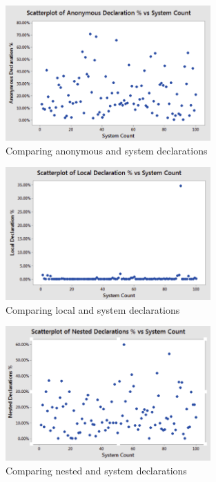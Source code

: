 \documentclass[12p]{article}
\begin{document}
\begin{figure}[h]
  \begin{center}
    \includegraphics[width=0.7\textwidth]{AnonVsSystemDeclarations.PNG}
    \caption{Comparing anonymous and system declarations}
    \label{fig:AnonVsSystemDeclarations}
  \end{center}
\end{figure}

\begin{figure}[h]
  \begin{center}
    \includegraphics[width=0.7\textwidth]{LocalVsSystemDeclarations.PNG}
    \caption{Comparing local and system declarations}
    \label{fig:LocalVsSystemDeclarations}
  \end{center}
\end{figure}

\begin{figure}[h]
  \begin{center}
    \includegraphics[width=0.7\textwidth]{NestedVsSystemDeclarations.PNG}
    \caption{Comparing nested and system declarations}
    \label{fig:NestedVsSystemDeclarations}
  \end{center}
\end{figure}
\end{document}
